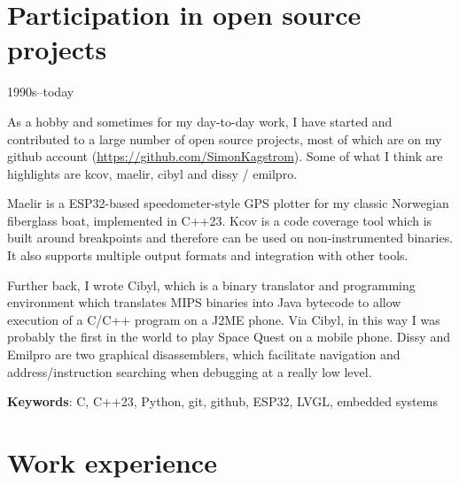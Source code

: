 \documentclass[a4paper]{article}
\begin{document}
\section{Participation in open source projects}

\begin{CV}

\item[1990s--today]

As a hobby and sometimes for my day-to-day work, I have started and contributed to a
large number of open source projects, most of which are on my github account
(\url{https://github.com/SimonKagstrom}). Some of what I think are highlights are kcov,
maelir, cibyl and dissy / emilpro.

Maelir is a ESP32-based speedometer-style GPS plotter for my classic Norwegian fiberglass
boat, implemented in C++23. Kcov is a code coverage tool which is built around breakpoints
and therefore can be used on non-instrumented binaries. It also supports multiple output
formats and integration with other tools. 

Further back, I wrote Cibyl, which is a binary translator and programming environment
which translates MIPS binaries into Java bytecode to allow execution of a C/C++ program
on a J2ME phone. Via Cibyl, in this way I was probably the first in the world to play
Space Quest on a mobile phone. Dissy and Emilpro are two graphical disassemblers, which
facilitate navigation and address/instruction searching when debugging at a really
low level.

\textbf{Keywords}: C, C++23, Python, git, github, ESP32, LVGL, embedded systems
\end{CV}

\section{Work experience}
\end{document}
